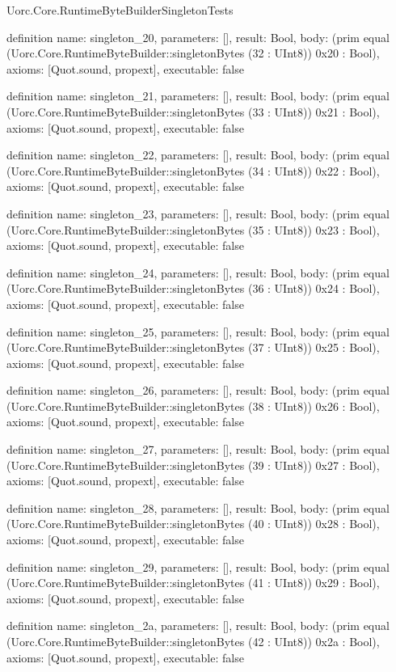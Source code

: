 \begin{lexlean}{Uorc.Core.RuntimeByteBuilderSingletonTests}
\begin{semanticmodule}
definition{
  name: singleton_20,
  parameters: [],
  result: Bool,
  body: (prim equal (Uorc.Core.RuntimeByteBuilder::singletonBytes (32 : UInt8)) 0x20 : Bool),
  axioms: [Quot.sound, propext],
  executable: false
}

definition{
  name: singleton_21,
  parameters: [],
  result: Bool,
  body: (prim equal (Uorc.Core.RuntimeByteBuilder::singletonBytes (33 : UInt8)) 0x21 : Bool),
  axioms: [Quot.sound, propext],
  executable: false
}

definition{
  name: singleton_22,
  parameters: [],
  result: Bool,
  body: (prim equal (Uorc.Core.RuntimeByteBuilder::singletonBytes (34 : UInt8)) 0x22 : Bool),
  axioms: [Quot.sound, propext],
  executable: false
}

definition{
  name: singleton_23,
  parameters: [],
  result: Bool,
  body: (prim equal (Uorc.Core.RuntimeByteBuilder::singletonBytes (35 : UInt8)) 0x23 : Bool),
  axioms: [Quot.sound, propext],
  executable: false
}

definition{
  name: singleton_24,
  parameters: [],
  result: Bool,
  body: (prim equal (Uorc.Core.RuntimeByteBuilder::singletonBytes (36 : UInt8)) 0x24 : Bool),
  axioms: [Quot.sound, propext],
  executable: false
}

definition{
  name: singleton_25,
  parameters: [],
  result: Bool,
  body: (prim equal (Uorc.Core.RuntimeByteBuilder::singletonBytes (37 : UInt8)) 0x25 : Bool),
  axioms: [Quot.sound, propext],
  executable: false
}

definition{
  name: singleton_26,
  parameters: [],
  result: Bool,
  body: (prim equal (Uorc.Core.RuntimeByteBuilder::singletonBytes (38 : UInt8)) 0x26 : Bool),
  axioms: [Quot.sound, propext],
  executable: false
}

definition{
  name: singleton_27,
  parameters: [],
  result: Bool,
  body: (prim equal (Uorc.Core.RuntimeByteBuilder::singletonBytes (39 : UInt8)) 0x27 : Bool),
  axioms: [Quot.sound, propext],
  executable: false
}

definition{
  name: singleton_28,
  parameters: [],
  result: Bool,
  body: (prim equal (Uorc.Core.RuntimeByteBuilder::singletonBytes (40 : UInt8)) 0x28 : Bool),
  axioms: [Quot.sound, propext],
  executable: false
}

definition{
  name: singleton_29,
  parameters: [],
  result: Bool,
  body: (prim equal (Uorc.Core.RuntimeByteBuilder::singletonBytes (41 : UInt8)) 0x29 : Bool),
  axioms: [Quot.sound, propext],
  executable: false
}

definition{
  name: singleton_2a,
  parameters: [],
  result: Bool,
  body: (prim equal (Uorc.Core.RuntimeByteBuilder::singletonBytes (42 : UInt8)) 0x2a : Bool),
  axioms: [Quot.sound, propext],
  executable: false
}


\end{semanticmodule}
\end{lexlean}
